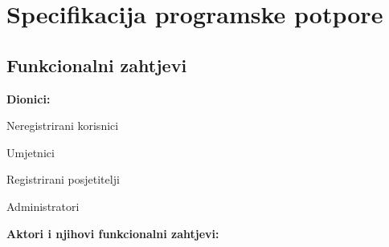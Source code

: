 \chapter{Specifikacija programske potpore}
		
	\section{Funkcionalni zahtjevi}
			
			\noindent \textbf{Dionici:}
			
			\begin{packed_enum}
				
				\item Neregistrirani korisnici
				\item Umjetnici				
				\item Registrirani posjetitelji
				\item Administratori
				
			\end{packed_enum}
			
			\noindent \textbf{Aktori i njihovi funkcionalni zahtjevi:}
			
